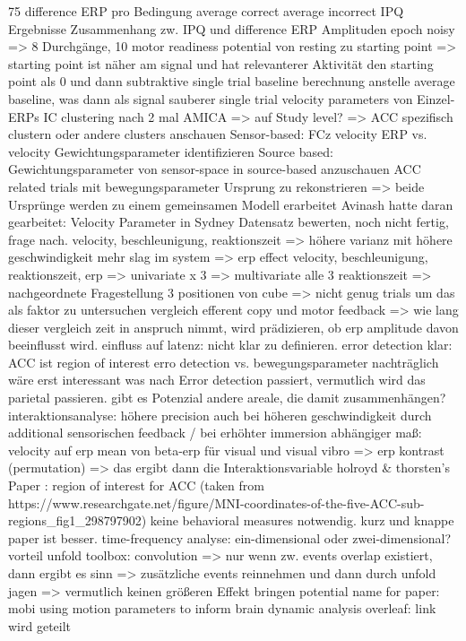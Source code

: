 
75 difference ERP pro Bedingung
average correct
average incorrect
IPQ Ergebnisse
Zusammenhang zw. IPQ und difference ERP Amplituden
epoch noisy => 8 Durchgänge, 10%
motor readiness potential von resting zu starting point
=> starting point ist näher am signal und hat relevanterer Aktivität
den starting point als 0 und dann subtraktive single trial baseline berechnung
anstelle average baseline, was dann als signal sauberer
single trial velocity parameters von Einzel-ERPs
IC clustering nach 2 mal AMICA
=> auf Study level?
=> ACC spezifisch clustern oder andere clusters anschauen
Sensor-based:
FCz velocity ERP vs. velocity
Gewichtungsparameter identifizieren
Source based:
Gewichtungsparameter von sensor-space in source-based anzuschauen
ACC related trials mit bewegungsparameter
Ursprung zu rekonstrieren
=> beide Ursprünge werden zu einem gemeinsamen Modell erarbeitet
Avinash hatte daran gearbeitet: Velocity Parameter in Sydney Datensatz bewerten, noch nicht fertig, frage nach.
velocity, beschleunigung, reaktionszeit
=> höhere varianz mit höhere geschwindigkeit mehr slag im system => erp effect
velocity, beschleunigung, reaktionszeit, erp
=> univariate x 3
=> multivariate alle 3
reaktionszeit => nachgeordnete Fragestellung
3 positionen von cube => nicht genug trials um das als faktor zu untersuchen
vergleich efferent copy und motor feedback => wie lang dieser vergleich zeit in anspruch nimmt, wird prädizieren, ob erp amplitude davon beeinflusst wird.
einfluss auf latenz: nicht klar zu definieren.
error detection klar: ACC ist region of interest
erro detection vs. bewegungsparameter
nachträglich wäre erst interessant was nach Error detection passiert, vermutlich wird das parietal passieren. gibt es Potenzial andere areale, die damit zusammenhängen?
interaktionsanalyse:
höhere precision auch bei höheren geschwindigkeit durch additional sensorischen feedback / bei erhöhter immersion
abhängiger maß: velocity auf erp
mean von beta-erp für visual und visual vibro
=> erp kontrast (permutation)
=> das ergibt dann die Interaktionsvariable
holroyd & thorsten's Paper : region of interest for ACC (taken from https://www.researchgate.net/figure/MNI-coordinates-of-the-five-ACC-sub-regions_fig1_298797902)
keine behavioral measures notwendig. kurz und knappe paper ist besser.
time-frequency analyse: ein-dimensional oder zwei-dimensional?
vorteil unfold toolbox: convolution
=> nur wenn zw. events overlap existiert, dann ergibt es sinn
=> zusätzliche events reinnehmen und dann durch unfold jagen
=> vermutlich keinen größeren Effekt bringen
potential name for paper: mobi using motion parameters to inform brain dynamic analysis
overleaf: link wird geteilt